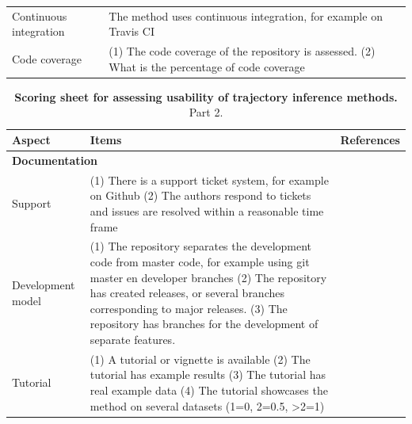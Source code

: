 \begin{table}[tbh!]
\begin{tabular}{p{2.5cm}p{8cm}p{1.5cm}}
		Continuous integration & The method uses continuous integration, for example on Travis CI & \cite{beaulieu-jones_reproducibilitycomputationalworkflows_2017,wickham_packagesorganizetest_2015,artaza_top10metrics_2016,silva_generalguidelinesbiomedical_2017}\\*
		
		Code coverage & (1) The code coverage of the repository is assessed. (2) What is the percentage of code coverage & \\
		
		\bottomrule
	\end{tabular}
	\endgroup{}
\end{table}


\begin{table}[tbh!]
	\caption{\textbf{Scoring sheet for assessing usability of trajectory inference methods.} Part 2.} \label{tab:scoresheet2}
	
	\centering\begingroup\fontsize{7}{9}\selectfont
	
	\begin{tabular}{p{2.5cm}p{8cm}p{1.5cm}}
		\toprule
		Aspect & Items & References \\ \midrule
		
		\multicolumn{3}{l}{\textbf{Documentation}} \\*
		
		Support & (1) There is a support ticket system, for example on Github (2) The authors respond to tickets and issues are resolved within a reasonable time frame & \cite{wilson_bestpracticesscientific_2014,wickham_packagesorganizetest_2015,artaza_top10metrics_2016,silva_generalguidelinesbiomedical_2017,jimenez_foursimplerecommendations_2017}\\*
		
		Development model & (1) The repository separates the development code from master code, for example using git master en developer branches (2) The repository has created releases, or several branches corresponding to major releases. (3) The repository has branches for the development of separate features. & \cite{driessen_successfulgitbranching_2010}\\*
		
		Tutorial & (1) A tutorial or vignette is available (2) The tutorial has example results (3) The tutorial has real example data (4) The tutorial showcases the method on several datasets (1=0, 2=0.5, >2=1) & \cite{wickham_packagesorganizetest_2015,silva_generalguidelinesbiomedical_2017,jimenez_foursimplerecommendations_2017,karimzadeh_topconsiderationscreating_2018,boulesteix_tensimplerules_2015}\\*
		

\end{tabular}
\end{table}
